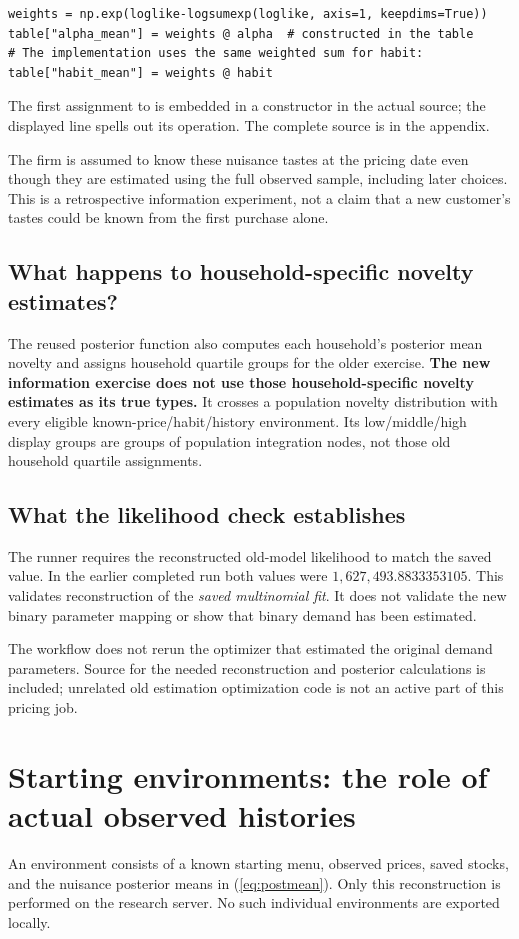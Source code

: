 \documentclass[11pt]{article}
\newcommand{\code}[1]{\texttt{\detokenize{#1}}}
\newcommand{\review}[1]{\begin{tcolorbox}[colback=pale,colframe=navy,title=Decision to verify]#1\end{tcolorbox}}
\begin{document}
\begin{lstlisting}
weights = np.exp(loglike-logsumexp(loglike, axis=1, keepdims=True))
table["alpha_mean"] = weights @ alpha  # constructed in the table
# The implementation uses the same weighted sum for habit:
table["habit_mean"] = weights @ habit
\end{lstlisting}
The first assignment to \code{alpha_mean} is embedded in a \code{DataFrame} constructor in the actual source; the displayed line spells out its operation. The complete source is in the appendix.

\review{The firm is assumed to know these nuisance tastes at the pricing date even though they are estimated using the full observed sample, including later choices. This is a retrospective information experiment, not a claim that a new customer's tastes could be known from the first purchase alone.}

\subsection{What happens to household-specific novelty estimates?}
The reused posterior function also computes each household's posterior mean novelty and assigns household quartile groups for the older exercise. \textbf{The new information exercise does not use those household-specific novelty estimates as its true types.} It crosses a population novelty distribution with every eligible known-price/habit/history environment. Its low/middle/high display groups are groups of population integration nodes, not those old household quartile assignments.

\subsection{What the likelihood check establishes}
The runner requires the reconstructed old-model likelihood to match the saved value. In the earlier completed run both values were $1{,}627{,}493.8833353105$. This validates reconstruction of the \emph{saved multinomial fit}. It does not validate the new binary parameter mapping or show that binary demand has been estimated.

The workflow does not rerun the optimizer that estimated the original demand parameters. Source for the needed reconstruction and posterior calculations is included; unrelated old estimation optimization code is not an active part of this pricing job.

\section{Starting environments: the role of actual observed histories}
An environment consists of a known starting menu, observed prices, saved stocks, and the nuisance posterior means in (\ref{eq:postmean}). Only this reconstruction is performed on the research server. No such individual environments are exported locally.
\end{document}
